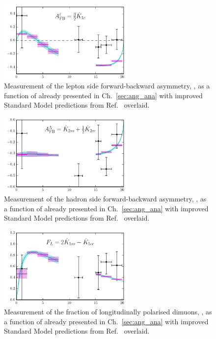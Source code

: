   \begin{figure}[h!]
\centering
\includegraphics[width=0.6\textwidth]{Lmumu/figs/NewPredictions/fig9b.pdf}
\caption{  Measurement of the lepton side forward-backward asymmetry, \afbl, 
	as a function of \qsq already presented in Ch.~\ref{sec:ang_ana} with improved Standard 
	Model predictions from Ref.~\cite{Detmold:2016pkz} overlaid.
 }
\end{figure}

  \begin{figure}[h!]
\centering
\includegraphics[width=0.6\textwidth]{Lmumu/figs/NewPredictions/fig9c.pdf}
\caption{  Measurement of the hadron side forward-backward asymmetry, \afbh, 
	as a function of \qsq already presented in Ch.~\ref{sec:ang_ana} with improved Standard 
	Model predictions from Ref.~\cite{Detmold:2016pkz} overlaid.
 }
\end{figure}

  \begin{figure}[h!]
\centering
\includegraphics[width=0.6\textwidth]{Lmumu/figs/NewPredictions/fig9a.pdf}
\caption{  Measurement of the fraction of longitudinally polarised dimuons, \fl, 
	as a function of \qsq already presented in Ch.~\ref{sec:ang_ana} with improved Standard 
	Model predictions from Ref.~\cite{Detmold:2016pkz} overlaid.
 }
\end{figure}
  